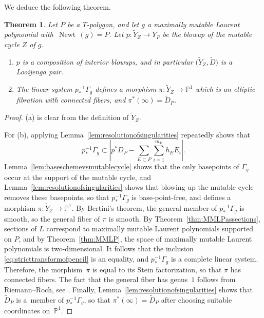 \documentclass[11pt]{article}
\numberwithin{equation}{section}
\newtheorem{Theorem}{Theorem}[section]
\DeclareMathOperator{\Newt}{{Newt \,}}
\newcommand{\PP}{\mathbb{P}}
\begin{document}
We deduce the following theorem.
\begin{Theorem}
	Let $P$ be a $T$-polygon, and let $g$ a maximally mutable Laurent polynomial with~${\Newt(g)=P}$. Let $p \colon \tilde{Y}_Z \rightarrow \bar{Y}_P$ be the blowup of the mutable cycle $Z$ of $g$.
	\begin{enumerate}[$(a)$]\itemsep=0pt
	\item $p$ is a composition of interior blowups, and in particular $\bigl(\tilde{Y}_Z, \tilde{D}\bigr)$ is a Looijenga pair.
	\item The linear system $p_*^{-1}\Gamma_g$ defines a morphism $\pi \colon \tilde{Y}_Z \rightarrow \PP^1$ which is an elliptic fibration with connected fibers, and $\pi^*(\infty)=\tilde{D}_P$.
	\end{enumerate}
\end{Theorem}
\begin{proof}
	(a) is clear from the definition of $\tilde{Y}_Z$.

	For (b), applying Lemma~\ref{lem:resolutionofsingularities} repeatedly shows that
	\begin{equation}\label{eq:stricttransformofpencil}
	p_*^{-1}\Gamma_g \subset 	\left|p^*D_P-\sum_{E \subset P}\sum_{i=1}^{m_E} h_E E_i\right|.
	\end{equation}
	Lemma~\ref{lem:baseschemevsmutablecycle} shows that the only basepoints of $\Gamma_g$ occur at the support of the mutable cycle, and Lemma~\ref{lem:resolutionofsingularities} shows that blowing up the mutable cycle removes these basepoints, so that $p_*^{-1}\Gamma_g$ is base-point-free, and defines a morphism $\pi \colon \tilde{Y}_Z \rightarrow \PP^1$. By Bertini's theorem, the general member of $p_*^{-1}\Gamma_g$ is smooth, so the general fiber of $\pi$ is smooth. By Theorem~\ref{thm:MMLPassections}, sections of $L$ correspond to maximally mutable Laurent polynomials supported on $P$, and by Theorem~\ref{thm:MMLP}, the space of maximally mutable Laurent polynomials is two-dimensional. It follows that the inclusion \eqref{eq:stricttransformofpencil} is an equality, and $p_*^{-1}\Gamma_g$ is a complete linear system. Therefore, the morphism~$\pi$ is equal to its Stein factorization, so that $\pi$ has connected fibers. The fact that the general fiber has genus~$1$ follows from Riemann--Roch, see \cite[Theorem 3.5]{Tveiten}. Finally, Lemma~\ref{lem:resolutionofsingularities} shows that~$\tilde{D}_P$ is a~member of $p_*^{-1}\Gamma_g$, so that $\pi^*(\infty)=\tilde{D}_P$ after choosing suitable coordinates on~$\PP^1$.
\end{proof}
\begingroup
\end{document}
